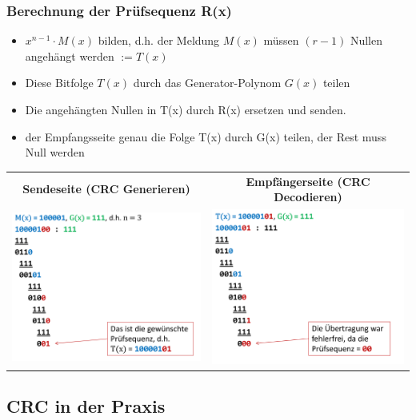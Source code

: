 \subsubsection{Berechnung der Prüfsequenz R(x)}
\begin{itemize}
	\item $x^{n-1} \cdot M(x)$ bilden, d.h. der Meldung $M(x)$ müssen $(r-1)$ Nullen angehängt werden $:= T(x)$ 
	\item Diese Bitfolge $T(x)$ durch das Generator-Polynom $G(x)$ teilen
	\item Die angehängten Nullen in T(x) durch R(x) ersetzen und senden.
	\item der Empfangsseite genau die Folge T(x) durch G(x) teilen, der Rest muss Null werden	
\end{itemize}

\begin{tabular}{c|c}
	\textbf{Sendeseite (CRC Generieren)} & \textbf{Empfängerseite (CRC Decodieren)} \\ 
	\includegraphics[width=7cm]{images/CRC/crc-gen.png} & \includegraphics[width=7cm]{images/CRC/crc-enc.png}  \\ 
\end{tabular} 

\subsection{CRC in der Praxis}


